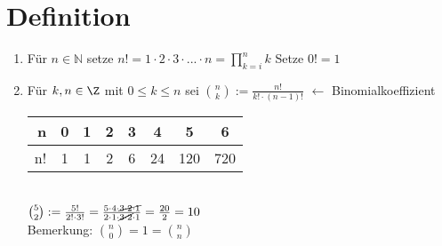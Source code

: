 \section{Definition}
\begin{enumerate}
\item Für $n\in \mathds{N}$ setze $n!=1\cdot 2\cdot 3\cdot ... \cdot n=\prod_{k=i}^n k$
Setze $0!=1$
\item Für $k,n\in \Z$ mit $0\le k \le n$ sei ${n \choose k} := \frac{n!}{k!\cdot(n-1)!}$ $\leftarrow$ Binomialkoeffizient\\
\begin{tabular}{r|c|c|c|c|c|c|c}
n & 0 & 1 & 2 & 3 & 4 & 5 & 6\\ \hline
n! & 1 & 1 & 2 & 6 & 24 & 120 & 720
\end{tabular}\\
\bsp
${5 \choose 2} := \frac{5!}{2!\cdot 3!} = \frac{5\cdot 4 \cdot\cancel{3 \cdot 2 \cdot 1}}{2\cdot 1\cdot \cancel{3\cdot 2}\cdot 1 } = \frac{20}{2}=10$\\
Bemerkung: ${ n \choose 0 }= 1 = {n \choose n}$
\end{enumerate}

